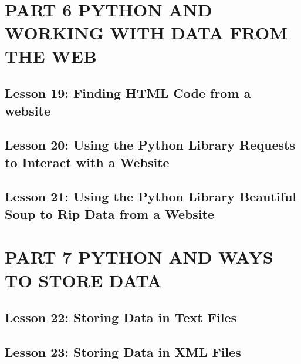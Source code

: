 \documentclass[11pt]{article}
\begin{document}
\section{PART 6 PYTHON AND WORKING WITH DATA FROM THE WEB}
\label{sec:org6867915}
\subsection{Lesson 19: Finding HTML Code from a website}
\label{sec:org63715e3}
\subsection{Lesson 20: Using the Python Library Requests to Interact with a Website}
\label{sec:org77acfd6}
\subsection{Lesson 21: Using the Python Library Beautiful Soup to Rip Data from a Website}
\label{sec:org7751afd}
\section{PART 7 PYTHON AND WAYS TO STORE DATA}
\label{sec:org06fda61}
\subsection{Lesson 22: Storing Data in Text Files}
\label{sec:org48ec833}
\subsection{Lesson 23: Storing Data in XML Files}
\label{sec:org7cbebb2}
\end{document}
